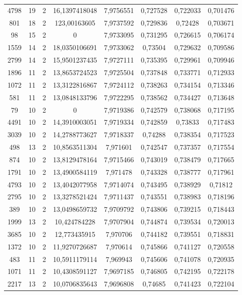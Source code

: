 \begin{longtable}{|c|c|c|c|c|c|c|c|}
4798 & 19 & 2 & 16,1397418048 & 7,9756551 & 0,727528 & 0,722033 & 0,701476 \\
801 & 18 & 2 & 123,00163605 & 7,9737592 & 0,729836 & 0,72428 & 0,703671 \\
98 & 15 & 2 & 0 & 7,9733095 & 0,731295 & 0,726615 & 0,706174 \\
1559 & 14 & 2 & 18,0350106691 & 7,9733062 & 0,73504 & 0,729632 & 0,709586 \\
2799 & 14 & 2 & 15,9501237435 & 7,9727111 & 0,735395 & 0,729961 & 0,709946 \\
1896 & 11 & 2 & 13,8653724523 & 7,9725504 & 0,737848 & 0,733771 & 0,712933 \\
1072 & 11 & 2 & 13,3122816867 & 7,9724112 & 0,738263 & 0,734154 & 0,713346 \\
581 & 11 & 2 & 13,0848133796 & 7,9722295 & 0,738562 & 0,734427 & 0,713648 \\
79 & 10 & 2 & 0 & 7,9719386 & 0,742579 & 0,738068 & 0,717195 \\
4491 & 10 & 2 & 14,3910003051 & 7,9719334 & 0,742859 & 0,73833 & 0,717483 \\
3039 & 10 & 2 & 14,2788773627 & 7,9718337 & 0,74288 & 0,738354 & 0,717523 \\
498 & 13 & 2 & 10,8563511304 & 7,971601 & 0,742547 & 0,737357 & 0,717554 \\
874 & 10 & 2 & 13,8129478164 & 7,9715466 & 0,743019 & 0,738479 & 0,717665 \\
1791 & 10 & 2 & 13,4900584119 & 7,971478 & 0,743328 & 0,738777 & 0,717961 \\
4793 & 10 & 2 & 13,4042077958 & 7,9714074 & 0,743495 & 0,738929 & 0,71812 \\
2795 & 10 & 2 & 13,3278521424 & 7,9711437 & 0,743551 & 0,738983 & 0,718196 \\
389 & 10 & 2 & 13,0498659732 & 7,9709792 & 0,743806 & 0,739215 & 0,718443 \\
1999 & 13 & 2 & 10,424784228 & 7,9707904 & 0,744874 & 0,739534 & 0,720013 \\
3685 & 10 & 2 & 12,773435915 & 7,970706 & 0,744182 & 0,739551 & 0,718831 \\
1372 & 10 & 2 & 11,9270726687 & 7,970614 & 0,745866 & 0,741127 & 0,720558 \\
483 & 11 & 2 & 10,5911179114 & 7,969943 & 0,745606 & 0,741078 & 0,720935 \\
1071 & 11 & 2 & 10,4308591127 & 7,9697185 & 0,746805 & 0,742195 & 0,722178 \\
2217 & 13 & 2 & 10,0706835643 & 7,9696808 & 0,74685 & 0,741423 & 0,722104 \\

\end{longtable}
